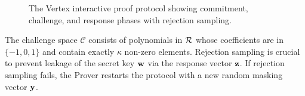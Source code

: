 \begin{figure}[htb]
\caption{The Vertex interactive proof protocol showing commitment, challenge, and response phases with rejection sampling.}
\label{fig:vertex_protocol}
\end{figure}

The challenge space $\mathcal{C}$ consists of polynomials in $\mathcal{R}$ whose coefficients are in $\{-1, 0, 1\}$ and contain exactly $\kappa$ non-zero elements. Rejection sampling is crucial to prevent leakage of the secret key $\mathbf{w}$ via the response vector $\mathbf{z}$. If rejection sampling fails, the Prover restarts the protocol with a new random masking vector $\mathbf{y}$.
